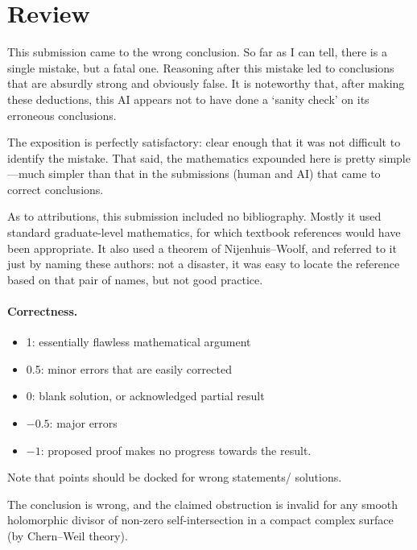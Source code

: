 \documentclass[11pt]{article}
\theoremstyle{definition}
\theoremstyle{remark}
\begin{document}
\maketitle


\section{Review}


This submission came to the wrong conclusion. So far as I can tell, there is a single mistake, but a fatal one. Reasoning after this mistake led to conclusions that are absurdly strong and obviously false. It is noteworthy that, after making these deductions, this AI appears not to have done a `sanity check' on its erroneous conclusions. 

The exposition is perfectly satisfactory: clear enough that it was not difficult to identify the mistake.  That said, the mathematics expounded here is pretty simple---much simpler than that in the submissions (human and AI) that came to correct conclusions. 

As to attributions, this submission included no bibliography. Mostly it used standard graduate-level mathematics, for which textbook references would have been appropriate.  It also used a theorem of Nijenhuis--Woolf, and referred to it just by naming these authors: not a disaster, it was easy to locate the reference based on that pair of names, but not good practice.


\paragraph{Correctness.}
\begin{itemize}
	\item  1: essentially flawless mathematical argument
	\item  0.5: minor errors that are easily corrected
	\item  0: blank solution, or acknowledged partial result
	\item  $-0.5$: major errors
	\item  $-1$: proposed proof makes no progress towards the result.
\end{itemize}
Note that points should be docked for wrong statements/ solutions.

\vspace{5mm}

 The conclusion is wrong, and the claimed obstruction is invalid for any smooth holomorphic divisor of non-zero self-intersection in a compact complex surface (by Chern--Weil theory). 
\end{document}
